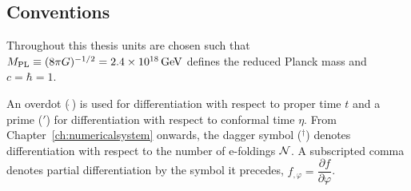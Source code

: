 \subsection*{Conventions}
\label{sec:conventions}
Throughout this thesis units are chosen such that $M_{\mathrm{PL}} \equiv (8\pi G )^{-1/2}=
2.4 \times 10^{18}\, {\rm GeV}$ defines the reduced Planck mass and $c=\hbar =1$. 

An overdot ($\dot{~}$) is used for differentiation with respect to proper
time $t$ and a prime ($'$) for differentiation with respect to conformal time
$\eta$. From Chapter~\ref{ch:numericalsystem} onwards,  the dagger symbol
($^\dagger$) denotes differentiation with respect to the
number of e-foldings $\mathcal{N}$.
% 
A subscripted comma denotes partial differentiation by the symbol it
precedes, \eg $f_{,\varphi} = \dfrac{\partial f}{\partial \varphi}$.


